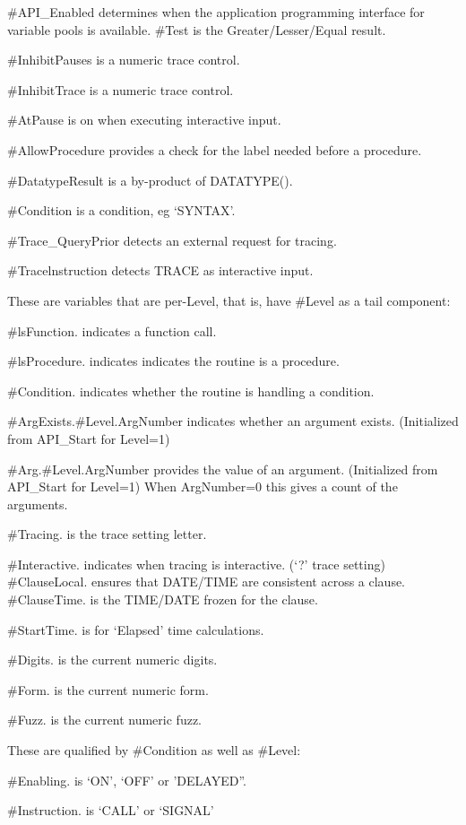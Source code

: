\#API\_Enabled determines when the application programming interface for
variable pools is available. \#Test is the Greater/Lesser/Equal result.

\#InhibitPauses is a numeric trace control.

\#InhibitTrace is a numeric trace control.

\#AtPause is on when executing interactive input.

\#AllowProcedure provides a check for the label needed before a
procedure.

\#DatatypeResult is a by-product of DATATYPE().

\#Condition is a condition, eg `SYNTAX'.

\#Trace\_QueryPrior detects an external request for tracing.

\#Tracelnstruction detects TRACE as interactive input.

These are variables that are per-Level, that is, have \#Level as a tail
component:

\#lsFunction. indicates a function call.

\#lsProcedure. indicates indicates the routine is a procedure.

\#Condition. indicates whether the routine is handling a condition.

\#ArgExists.\#Level.ArgNumber indicates whether an argument exists.
(Initialized from API\_Start for Level=1)

\#Arg.\#Level.ArgNumber provides the value of an argument. (Initialized
from API\_Start for Level=1) When ArgNumber=0 this gives a count of the
arguments.

\#Tracing. is the trace setting letter.

\#Interactive. indicates when tracing is interactive. (`?' trace
setting) \#ClauseLocal. ensures that DATE/TIME are consistent across a
clause. \#ClauseTime. is the TIME/DATE frozen for the clause.

\#StartTime. is for `Elapsed' time calculations.

\#Digits. is the current numeric digits.

\#Form. is the current numeric form.

\#Fuzz. is the current numeric fuzz.

These are qualified by \#Condition as well as \#Level:

\#Enabling. is `ON', `OFF' or 'DELAYED''.

\#Instruction. is `CALL' or `SIGNAL'

